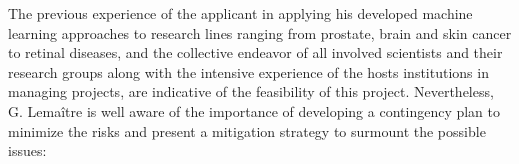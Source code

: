 The previous experience of the applicant in applying his developed machine learning approaches to research lines ranging from prostate, brain and skin cancer to retinal diseases, and the collective endeavor of all involved scientists and their research groups along with the intensive experience of the hosts institutions in managing projects, are indicative of the feasibility of this project. 
Nevertheless, G. Lema\^itre is well aware of the importance of developing a contingency plan to minimize the risks and present a mitigation strategy to surmount the possible issues:
